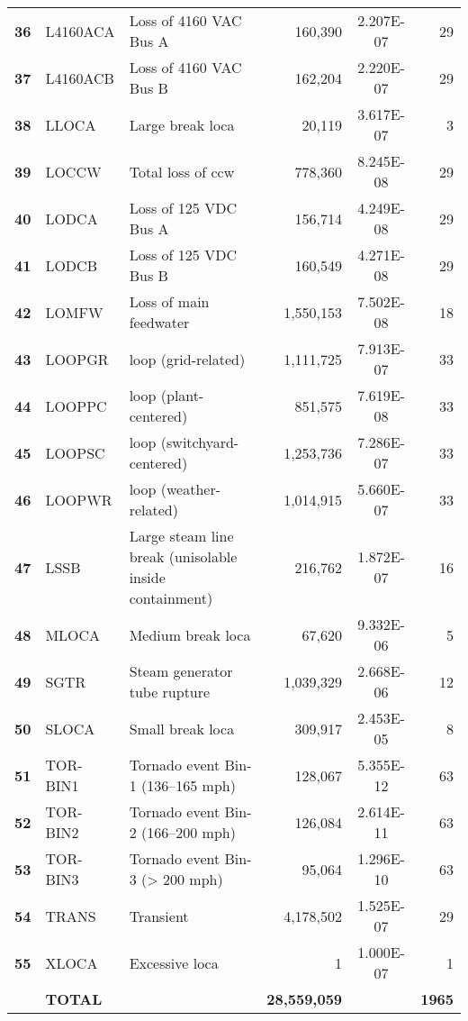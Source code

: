 \begin{longtable}{@{}lllrSr@{}}
\textbf{36} & L4160ACA         & Loss of 4160 VAC Bus A & 160,390   & 2.207E-07 & 29 \\
\textbf{37} & L4160ACB         & Loss of 4160 VAC Bus B & 162,204   & 2.220E-07 & 29 \\
\textbf{38} & LLOCA            & Large break \acrshort{loca} & 20,119    & 3.617E-07 & 3  \\
\textbf{39} & LOCCW            & Total loss of \acrshort{ccw} & 778,360   & 8.245E-08 & 29 \\
\textbf{40} & LODCA            & Loss of 125 VDC Bus A & 156,714   & 4.249E-08 & 29 \\
\textbf{41} & LODCB            & Loss of 125 VDC Bus B & 160,549   & 4.271E-08 & 29 \\
\textbf{42} & LOMFW            & Loss of main feedwater & 1,550,153 & 7.502E-08 & 18 \\
\textbf{43} & LOOPGR           & \acrshort{loop} (grid-related) & 1,111,725 & 7.913E-07 & 33 \\
\textbf{44} & LOOPPC           & \acrshort{loop} (plant-centered) & 851,575   & 7.619E-08 & 33 \\
\textbf{45} & LOOPSC           & \acrshort{loop} (switchyard-centered) & 1,253,736 & 7.286E-07 & 33 \\
\textbf{46} & LOOPWR           & \acrshort{loop} (weather-related) & 1,014,915 & 5.660E-07 & 33 \\
\textbf{47} & LSSB             & Large steam line break (unisolable inside containment) & 216,762   & 1.872E-07 & 16 \\
\textbf{48} & MLOCA            & Medium break \acrshort{loca} & 67,620    & 9.332E-06 & 5  \\
\textbf{49} & SGTR             & Steam generator tube rupture & 1,039,329 & 2.668E-06 & 12 \\
\textbf{50} & SLOCA            & Small break \acrshort{loca} & 309,917   & 2.453E-05 & 8  \\
\textbf{51} & TOR-BIN1         & Tornado event Bin-1 (136--165 mph) & 128,067   & 5.355E-12 & 63 \\
\textbf{52} & TOR-BIN2         & Tornado event Bin-2 (166--200 mph) & 126,084   & 2.614E-11 & 63 \\
\textbf{53} & TOR-BIN3         & Tornado event Bin-3 (> 200 mph) & 95,064    & 1.296E-10 & 63 \\
\textbf{54} & TRANS            & Transient & 4,178,502 & 1.525E-07 & 29 \\
\textbf{55} & XLOCA            & Excessive \acrshort{loca} & 1         & 1.000E-07 & 1  \\
\textbf{}   & \textbf{TOTAL}   & & \textbf{28,559,059} & & \textbf{1965} \\* \bottomrule

\end{longtable}

